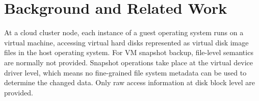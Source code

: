 
\section{Background and Related Work}
\label{sect:background}




At a cloud cluster node, each instance of a guest operating system runs on a virtual machine, accessing virtual hard disks 
represented as virtual disk image files in the host operating system.
For VM snapshot backup, file-level semantics are normally not provided.
Snapshot operations take place at the virtual device driver level, which means no fine-grained file system metadata can be used to determine the changed data. Only raw access information at disk block level are provided. 



